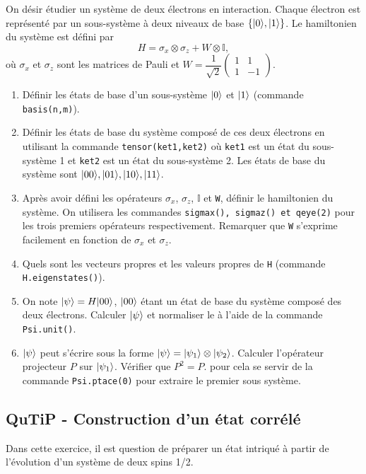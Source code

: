 On désir étudier un système de deux électrons en interaction. Chaque électron est représenté par un sous-système à deux niveaux de base $\{\vert0\rangle,\vert1\rangle\}$. Le hamiltonien du système est défini par
\begin{equation}
H = \sigma_x\otimes\sigma_z+W\otimes\mathbb{I},
\end{equation}
où $\sigma_x$ et $\sigma_z$ sont les matrices de Pauli et $W=\dfrac{1}{\sqrt{2}}\begin{pmatrix}1 & 1 \\ 1 & -1 \end{pmatrix}$.
\begin{enumerate}
\item Définir les états de base d'un sous-système $\vert0\rangle$ et $\vert1\rangle$ (commande \texttt{basis(n,m)}).

\item Définir les états de base du système composé de ces deux électrons en utilisant la commande \texttt{tensor(ket1,ket2)} où \texttt{ket1} est un état du sous-système 1 et \texttt{ket2} est un état du sous-système 2. Les états de base du système sont $\vert00\rangle, \vert01\rangle, \vert10\rangle, \vert11\rangle$.

\item Après avoir défini les opérateurs $\sigma_x$, $\sigma_z$, $\mathbb{I}$ et \texttt{W}, définir le hamiltonien du système. On utilisera les commandes \texttt{sigmax(), sigmaz() et qeye(2)} pour les trois premiers opérateurs respectivement. Remarquer que \texttt{W} s'exprime facilement en fonction de $\sigma_x$ et $\sigma_z$.

\item Quels sont les vecteurs propres et les valeurs propres de \texttt{H} (commande \texttt{H.eigenstates()}).

\item On note $\vert\psi\rangle=H\vert00\rangle$, $\vert00\rangle$ étant un état de base du système composé des deux électrons. Calculer $\vert\psi\rangle$ et normaliser le à l'aide de la commande \texttt{Psi.unit()}.

\item  $\vert\psi\rangle$ peut s'écrire sous la forme $\vert\psi\rangle=\vert\psi_1\rangle\otimes\vert\psi_2\rangle$. Calculer l'opérateur projecteur $P$ sur $\vert\psi_1\rangle$. Vérifier que $P^2=P$. pour cela se servir de la commande \texttt{Psi.ptace(0)} pour extraire le premier sous système.
\end{enumerate}

\subsection{QuTiP - Construction d'un état corrélé}
Dans cette exercice, il est question de préparer un état intriqué à partir de l'évolution d'un système de deux spins 1/2.

